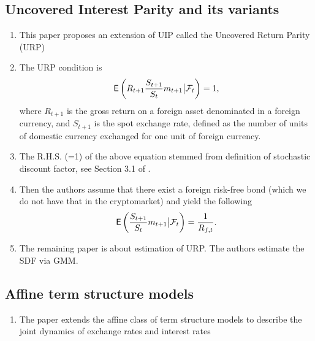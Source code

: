 \documentclass[square]{article} %
\theoremstyle{plain}
\theoremstyle{definition} %
\begin{document}
\subsection{Uncovered Interest Parity and its variants}
\cite{cappiello2007uncovered}
\begin{enumerate}
  \item This paper proposes an extension of UIP called the Uncovered Return Parity (URP)
  \item The URP condition is 
  \begin{align*}
    \mathbb{\sf E}\left(R_{t+1}\frac{S_{t+1}}{S_t}m_{t+1}\big|\mathcal{F}_t\right)=1,
  \end{align*}
  where $R_{t+1}$ is the gross return on a foreign asset denominated in a foreign currency, and $S_{t+1}$ is the spot exchange rate, defined as the number of units of domestic currency exchanged for one unit of foreign currency. 
  \item The R.H.S. (=1) of the above equation stemmed from definition of stochastic discount factor, see Section 3.1 of \cite{back2010asset}. 
  \item Then the authors assume that there exist a foreign risk-free bond (which we do not have that in the cryptomarket) and yield the following
  \begin{align*}
    \mathbb{\sf E}\left(\frac{S_{t+1}}{S_t}m_{t+1}\big|\mathcal{F}_t\right) = \frac{1}{R_{f,t}}.
  \end{align*}
  \item The remaining paper is about estimation of URP. The authors estimate the SDF via GMM. 
\end{enumerate}

\subsection{Affine term structure models}
\cite{anderson2010affine}
\begin{enumerate}
  \item The paper extends the affine class of term structure models to describe the joint dynamics of exchange rates and interest rates
\end{enumerate}

\end{document}
